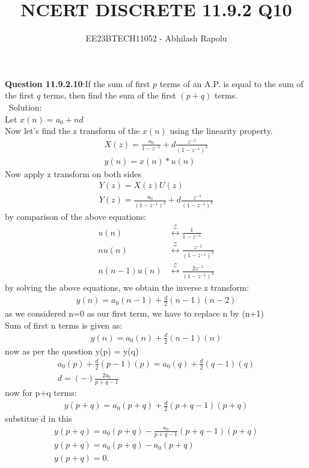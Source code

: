 \documentclass[journal,12pt,twocolumn]{IEEEtran}
\title{NCERT DISCRETE 11.9.2 Q10}
\author{EE23BTECH11052 - Abhilash Rapolu }
\begin{document}
\maketitle
\newpage
\textbf{Question 11.9.2.10}:If the sum of first $p$ terms of an A.P. is equal to the sum of the first $q$ terms, then
find the sum of the first $(p + q)$ terms.\\
\ Solution:
\\Let $x(n)=a_0+nd$\\
Now let's find the z transform of the $x(n)$ using the linearity property.\\
\begin{align}
X(z)=\frac{a_0}{1-z^{-1}}+d\frac{z^{-1}}{(1-z^{-1})^2}\\
y(n) = x(n)*u(n)
\end{align}
Now apply z transform on both sides\\
\begin{align}
Y(z)=X(z)U(z)\\
Y(z)=\frac{a_0}{(1-z^{-1})^2}+d\frac{z^{-1}}{(1-z^{-1})^3}
\end{align}
by comparison of the above equations:\\
\begin{align}
u(n) &\stackrel{\mathcal{Z}}{\longleftrightarrow} \frac{1}{1-z^{-1}}\\
nu(n) &\stackrel{\mathcal{Z}}{\longleftrightarrow} \frac{z^{-1}}{(1-z^{-1})^2} \\
n(n-1)u(n) &\stackrel{\mathcal{Z}}{\longleftrightarrow} \frac{2z^{-1}}{(1-z^{-1})^3} 
\end{align}
by solving the above equations, we obtain the inverse z transform:\\
\begin{align}
y(n)=a_0(n-1)+\frac{d}{2}(n-1)(n-2)
\end{align}
as we considered n=0 as our first term, we have to replace n by (n+1)\\
Sum of first n terms is given as:\\
\begin{align}
y(n)=a_0(n)+\frac{d}{2}(n-1)(n)
\end{align}
now as per the question y(p) = y(q)\\
\begin{align}
a_0(p)+\frac{d}{2}(p-1)(p)=a_0(q)+\frac{d}{2}(q-1)(q)\\
d=(-)\frac{2a_0}{p+q-1}
\end{align}
now for p+q terms:\\
\begin{align}
y(p+q)=a_0(p+q)+\frac{d}{2}(p+q-1)(p+q)
\end{align}
substitue d in this\\
\begin{align}
y(p+q)=a_0(p+q)-\frac{a_0}{p+q-1}(p+q-1)(p+q)\\
y(p+q)=a_0(p+q)-a_0(p+q)\\
y(p+q)=0.
\end{align}
\end{document}
